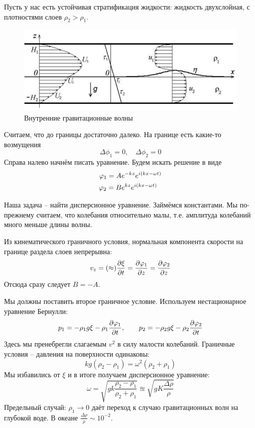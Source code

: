 Пусть у нас есть устойчивая стратификация жидкости: жидкость двухслойная, с плотностями слоев $\rho_2>\rho_1$.
\begin{figure}[H]
    \centering
    \includegraphics[scale=0.7]{photo/vnutr.png}
    \caption{Внутренние гравитационные волны}
    \label{fig:vnutr}
\end{figure}
Считаем, что до границы достаточно далеко.
На границе есть какие-то возмущения
\begin{equation}
    \Delta\phi_1 = 0, \quad \Delta\phi_2 = 0
\end{equation}
Справа налево начнём писать уравнение.
Будем искать решение в виде
\begin{gather}
    \phi_1 = A e^{-kz} e^{i(kx-\omega t)}\\
    \phi_2 = B e^{kz} e^{i(kx-\omega t)}\hphantom{^{-}}
\end{gather}

Наша задача -- найти дисперсионное уравнение. Займёмся константами. Мы по-прежнему считаем, что колебания относительно малы,
т.е. амплитуда колебаний много меньше длины волны.

Из кинематического граничного условия, нормальная компонента скорости на границе раздела слоев непрерывна:
\begin{equation}
    v_z = (\approx) \pdv{\xi}{t} = \pdv{\varphi_1}{z} = \pdv{\varphi_2}{z}
\end{equation}
Отсюда сразу следует $B = -A$.

Мы должны поставить второе граничное условие. Используем нестационарное уравнение Бернулли:
\begin{equation}
    p_1 = -\rho_1 g \xi - \rho_1 \pdv{\varphi_1}{t}, \qquad
    p_2 = -\rho_2 g \xi - \rho_2 \pdv{\varphi_2}{t}
\end{equation}
Здесь мы пренебрегли слагаемым $v^2$ в силу малости колебаний.
Граничные условия -- давления на поверхности одинаковы:
\begin{equation}
    kg(\rho_2-\rho_1) = \omega^2(\rho_2+\rho_1)
\end{equation}
Мы избавились от $\xi$ и в итоге получаем дисперсионное уравнение:
\begin{equation}
    \omega = \sqrt{gk\frac{\rho_2-\rho_1}{\rho_2+\rho_1}} \approxeq \sqrt{gK\frac{\Delta \rho}{\rho}}
\end{equation}
Предельный случай: $\rho_1 \to 0$ даёт переход к случаю гравитационных волн на глубокой воде. 
В океане $ \frac{\Delta\rho}{\rho}\sim 10^{-2}$.

